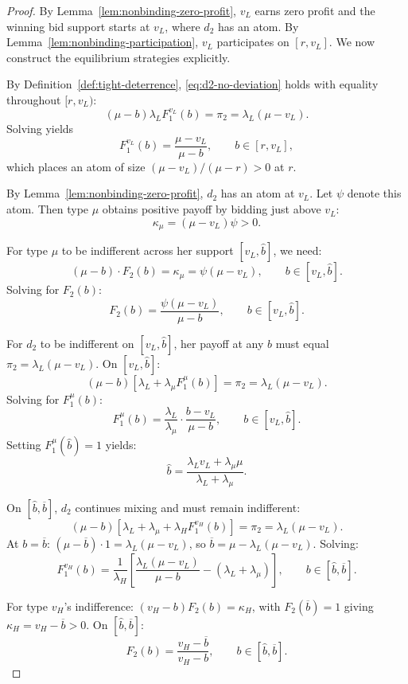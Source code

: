 \begin{proof}
By Lemma~\ref{lem:nonbinding-zero-profit}, $v_L$ earns zero profit and the winning bid support starts at $v_L$, where $d_2$ has an atom. By Lemma~\ref{lem:nonbinding-participation}, $v_L$ participates on $[r, v_L]$. We now construct the equilibrium strategies explicitly.

\noindent By Definition~\ref{def:tight-deterrence}, \eqref{eq:d2-no-deviation} holds with equality throughout $[r, v_L)$:
\[
(\mu - b) \lambda_L F_1^{v_L}(b) = \pi_2 = \lambda_L(\mu - v_L).
\]
Solving yields
\[
F_1^{v_L}(b) = \frac{\mu - v_L}{\mu - b}, \qquad b \in [r, v_L],
\]
which places an atom of size $(\mu - v_L)/(\mu - r) > 0$ at $r$.

\noindent By Lemma~\ref{lem:nonbinding-zero-profit}, $d_2$ has an atom at $v_L$. Let $\psi$ denote this atom. Then type $\mu$ obtains positive payoff by bidding just above $v_L$:
\[
\kappa_{\mu} = (\mu - v_L) \psi > 0.
\]

\noindent For type $\mu$ to be indifferent across her support $[v_L, \hat{b}]$, we need:
\[
(\mu - b) \cdot F_2(b) = \kappa_{\mu} = \psi(\mu - v_L), \qquad b \in [v_L, \hat{b}].
\]
Solving for $F_2(b)$:
\[
F_2(b) = \frac{\psi(\mu - v_L)}{\mu - b}, \qquad b \in [v_L, \hat{b}].
\]

\noindent For $d_2$ to be indifferent on $[v_L, \hat{b}]$, her payoff at any $b$ must equal $\pi_2 = \lambda_L(\mu - v_L)$. On $[v_L, \hat{b}]$:
\[
(\mu - b)[\lambda_L + \lambda_{\mu} F_1^{\mu}(b)] = \pi_2 = \lambda_L(\mu - v_L).
\]
Solving for $F_1^{\mu}(b)$:
\[
F_1^{\mu}(b) = \frac{\lambda_L}{\lambda_{\mu}} \cdot \frac{b - v_L}{\mu - b}, \qquad b \in [v_L, \hat{b}].
\]
Setting $F_1^{\mu}(\hat{b}) = 1$ yields:
\[
\hat{b} = \frac{\lambda_L v_L + \lambda_{\mu} \mu}{\lambda_L + \lambda_{\mu}}.
\]

\noindent On $[\hat{b}, \overline{b}]$, $d_2$ continues mixing and must remain indifferent:
\[
(\mu - b)[\lambda_L + \lambda_{\mu} + \lambda_H F_1^{v_H}(b)] = \pi_2 = \lambda_L(\mu - v_L).
\]
At $b = \overline{b}$: $(\mu - \overline{b}) \cdot 1 = \lambda_L(\mu - v_L)$, so $\overline{b} = \mu - \lambda_L(\mu - v_L)$. Solving:
\[
F_1^{v_H}(b) = \frac{1}{\lambda_H}\left[\frac{\lambda_L(\mu - v_L)}{\mu - b} - (\lambda_L + \lambda_{\mu})\right], \qquad b \in [\hat{b}, \overline{b}].
\]

\noindent For type $v_H$'s indifference: $(v_H - b)F_2(b) = \kappa_H$, with $F_2(\overline{b}) = 1$ giving $\kappa_H = v_H - \overline{b} > 0$. On $[\hat{b}, \overline{b}]$:
\[
F_2(b) = \frac{v_H - \overline{b}}{v_H - b}, \qquad b \in [\hat{b}, \overline{b}].
\]


\end{proof}
